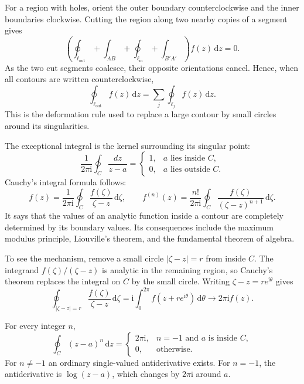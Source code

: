 For a region with holes, orient the outer boundary counterclockwise and the inner boundaries clockwise. Cutting the region along two nearby copies of a segment gives
\begin{equation}
\left(\oint_{\ell_{\mathrm{out}}}+\int_{AB}+\oint_{\ell_{\mathrm{in}}}+\int_{B'A'}\right)f(z)\,\mathrm{d}z=0.
\end{equation}
As the two cut segments coalesce, their opposite orientations cancel. Hence, when all contours are written counterclockwise,
\begin{equation}
\oint_{\ell_{\mathrm{out}}}f(z)\,\mathrm{d}z=\sum_j\oint_{\ell_j}f(z)\,\mathrm{d}z.
\end{equation}
This is the deformation rule used to replace a large contour by small circles around its singularities.

The exceptional integral is the kernel surrounding its singular point:
\begin{equation}
\frac{1}{2\pi\mathrm{i}}\oint_C\frac{dz}{z-a}=
\begin{cases}1,&a\text{ lies inside }C,\\0,&a\text{ lies outside }C.\end{cases}
\end{equation}
Cauchy's integral formula follows:
\begin{equation}
f(z)=\frac{1}{2\pi\mathrm{i}}\oint_C\frac{f(\zeta)}{\zeta-z}\,\mathrm{d}\zeta,
\qquad
f^{(n)}(z)=\frac{n!}{2\pi\mathrm{i}}\oint_C\frac{f(\zeta)}{(\zeta-z)^{n+1}}\,\mathrm{d}\zeta.
\end{equation}
It says that the values of an analytic function inside a contour are completely determined by its boundary values. Its consequences include the maximum modulus principle, Liouville's theorem, and the fundamental theorem of algebra.

To see the mechanism, remove a small circle $|\zeta-z|=r$ from inside $C$. The integrand $f(\zeta)/(\zeta-z)$ is analytic in the remaining region, so Cauchy's theorem replaces the integral on $C$ by the small circle. Writing $\zeta-z=re^{\mathrm{i}\theta}$ gives
\begin{equation}
\oint_{|\zeta-z|=r}\frac{f(\zeta)}{\zeta-z}\,\mathrm{d}\zeta
=\mathrm{i}\int_0^{2\pi}f(z+re^{\mathrm{i}\theta})\,\mathrm{d}\theta
\longrightarrow2\pi\mathrm{i}f(z).
\end{equation}

\begin{example}
For every integer $n$,
\begin{equation}
\oint_C(z-a)^n\,\mathrm{d}z=\begin{cases}2\pi\mathrm{i},&n=-1\text{ and }a\text{ is inside }C,\\0,&\text{otherwise}.
\end{cases}
\end{equation}
For $n\ne-1$ an ordinary single-valued antiderivative exists. For $n=-1$, the antiderivative is $\log(z-a)$, which changes by $2\pi\mathrm{i}$ around $a$.
\end{example}

